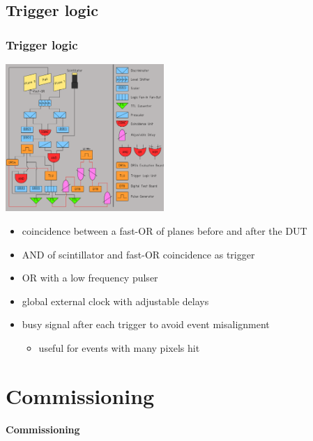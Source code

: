\documentclass[9pt]{beamer}
\begin{document}
\subsection{Trigger logic}
\begin{frame}
	\frametitle{Trigger logic}
	\begin{center}
		\begin{minipage}{6cm}
			\centering
			\includegraphics[width=6cm]{Pics/triglog2}
		\end{minipage}
		\hspace*{2pt}
		\begin{minipage}[c][.7\textheight]{5cm}
			\begin{itemize}
				\setlength{\itemsep}{\fill}
				\item coincidence between a fast-OR of planes before and after the DUT
				\item AND of scintillator and fast-OR coincidence as trigger
				\item OR with a low frequency pulser
				\item global external clock with adjustable delays
				\item busy signal after each trigger to avoid event misalignment
				\begin{itemize}
					\item useful for events with many pixels hit 
				\end{itemize}
			\end{itemize}
		\end{minipage}\no\s
	\end{center}
\end{frame}
\section{Commissioning}
\begin{frame}
	\begin{alertblock}{
		\begin{center}
			\Large{\textbf{Commissioning}}
		\end{center}}
	\end{alertblock}
\end{frame}
\end{document}

